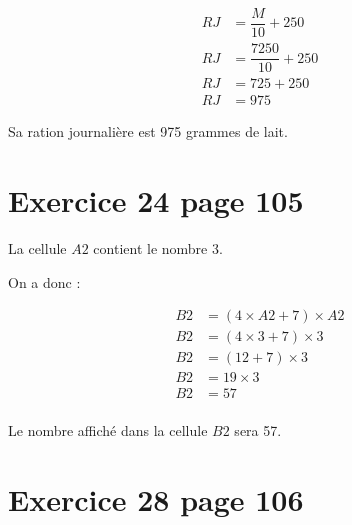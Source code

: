 \documentclass[12pt,a4paper]{article}
\begin{document}
\begin{align*}
RJ &= \dfrac{M}{10} + 250 \\
RJ &= \dfrac{7250}{10} + 250 \\
RJ &= 725 + 250 \\
RJ &= 975
\end{align*}

Sa ration journalière est 975 grammes de lait.

\section*{Exercice 24 page 105}

La cellule $A2$ contient le nombre 3.

On a donc :

\vspace*{-1cm}

\begin{align*}
	B2 &= (4 \times A2 + 7) \times A2\\
	B2 &= (4 \times 3 + 7) \times 3\\
	B2 &= (12 + 7) \times 3\\
	B2 &= 19 \times 3\\
	B2 &= 57\\
\end{align*}

\vspace*{-0.5cm}

Le nombre affiché dans la cellule $B2$ sera 57.

\newpage

\section*{Exercice 28 page 106}
\end{document}

